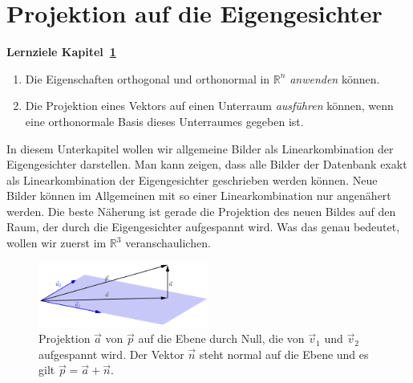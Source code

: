 \section{Projektion auf die Eigengesichter} \label{sec:eigenbasis}
\begin{tcolorbox}
	\centerline{\textbf{Lernziele Kapitel~\ref{sec:eigenbasis}}}
	\begin{enumerate}[leftmargin=*,label=\thesection.\arabic*]
		\item Die Eigenschaften \glqq{}orthogonal\grqq{} und \glqq{}orthonormal\grqq{} in $\mathbb R^n$ \textit{anwenden} können.
		\item Die Projektion eines Vektors auf einen Unterraum \textit{ausführen} können, wenn eine orthonormale Basis dieses Unterraumes gegeben ist.
	\end{enumerate}
\end{tcolorbox}
In diesem Unterkapitel wollen wir allgemeine Bilder als Linearkombination der Eigengesichter darstellen.
Man kann zeigen, dass alle Bilder der Datenbank exakt als Linearkombination der Eigengesichter geschrieben werden können.
Neue Bilder können im Allgemeinen mit so einer Linearkombination nur angenähert werden.
Die beste Näherung ist gerade die Projektion des neuen Bildes auf den Raum, der durch die Eigengesichter aufgespannt wird.
Was das genau bedeutet, wollen wir zuerst im $\mathbb R^3$ veranschaulichen.
\begin{figure}[ht]
	\centering
	\includegraphics[width=0.5\textwidth]{images/projection}
	\caption{Projektion $\vec a$ von $\vec p$ auf die Ebene durch Null, die von $\vec v_1$ und $\vec v_2$ aufgespannt wird. Der Vektor $\vec n$ steht normal auf die Ebene und es gilt $\vec p=\vec a+\vec n$.}
	\label{fig:projection}
\end{figure}
